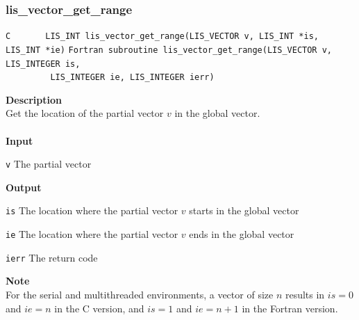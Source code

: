 \documentclass[a4paper]{article}
\newcommand{\namelistlabel}[1]{\mbox{#1}\hfill}
\newenvironment{namelist}[1]{%
\begin{list}{}
  {\let\makelabel\namelistlabel
  \settowidth{\labelwidth}{#1}
  \setlength{\leftmargin}{1.1\labelwidth}}
  }{%
\end{list}}
\begin{document}
\subsubsection{lis\_vector\_get\_range}
\begin{screen}
\verb|C       LIS_INT lis_vector_get_range(LIS_VECTOR v, LIS_INT *is, LIS_INT *ie)|
\verb|Fortran subroutine lis_vector_get_range(LIS_VECTOR v, LIS_INTEGER is,|\\
\verb|         LIS_INTEGER ie, LIS_INTEGER ierr) |
\end{screen}
{\bf Description}\\
\indent
Get the location of the partial vector $v$ in the global vector.
\\ \\
\noindent
{\bf Input}
\begin{namelist}{XXXXXXXXXXXXXXXXXXXX}
\item[\tt v] The partial vector
\end{namelist}
{\bf Output}
\begin{namelist}{XXXXXXXXXXXXXXXXXXXX}
\item[\tt is] The location where the partial vector $v$ starts in the global vector
\item[\tt ie] The location where the partial vector $v$ ends in the global vector
\item[\tt ierr] The return code
\end{namelist}
{\bf Note}\\
\indent
For the serial and multithreaded environments, a vector of size $n$ results in $is = 0$ and $ie = n$ in the C version, and $is = 1$ and $ie = n+1$ in the Fortran version.

\newpage
\end{document}
